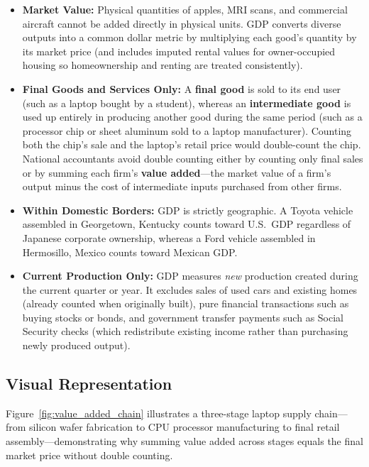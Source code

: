 \documentclass[11pt,letterpaper]{article}
\begin{document}
\begin{itemize}
    \item \textbf{Market Value:} Physical quantities of apples, MRI scans, and commercial aircraft cannot be added directly in physical units. GDP converts diverse outputs into a common dollar metric by multiplying each good's quantity by its market price (and includes imputed rental values for owner-occupied housing so homeownership and renting are treated consistently).
    \item \textbf{Final Goods and Services Only:} A \textbf{final good} is sold to its end user (such as a laptop bought by a student), whereas an \textbf{intermediate good} is used up entirely in producing another good during the same period (such as a processor chip or sheet aluminum sold to a laptop manufacturer). Counting both the chip's sale and the laptop's retail price would double-count the chip. National accountants avoid double counting either by counting only final sales or by summing each firm's \textbf{value added}—the market value of a firm's output minus the cost of intermediate inputs purchased from other firms.
    \item \textbf{Within Domestic Borders:} GDP is strictly geographic. A Toyota vehicle assembled in Georgetown, Kentucky counts toward U.S.\ GDP regardless of Japanese corporate ownership, whereas a Ford vehicle assembled in Hermosillo, Mexico counts toward Mexican GDP.
    \item \textbf{Current Production Only:} GDP measures \emph{new} production created during the current quarter or year. It excludes sales of used cars and existing homes (already counted when originally built), pure financial transactions such as buying stocks or bonds, and government transfer payments such as Social Security checks (which redistribute existing income rather than purchasing newly produced output).
\end{itemize}

\subsection*{Visual Representation}
Figure~\ref{fig:value_added_chain} illustrates a three-stage laptop supply chain—from silicon wafer fabrication to CPU processor manufacturing to final retail assembly—demonstrating why summing value added across stages equals the final market price without double counting.
\end{document}
